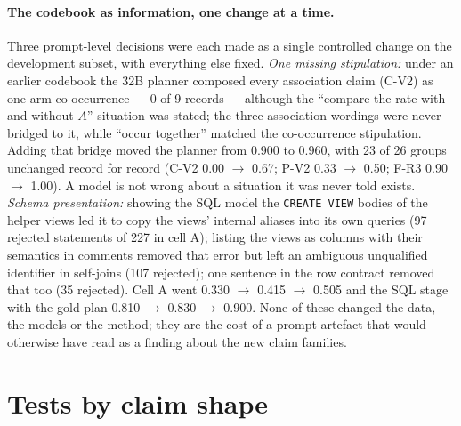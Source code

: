 \paragraph{The codebook as information, one change at a time.} Three
prompt-level decisions were each made as a single controlled change on the
development subset, with everything else fixed. \emph{One missing
stipulation:} under an earlier codebook the 32B planner composed every
association claim (C-V2) as one-arm co-occurrence --- 0 of 9 records ---
although the ``compare the rate with and without $A$'' situation was stated;
the three association wordings were never bridged to it, while ``occur
together'' matched the co-occurrence stipulation. Adding that bridge moved the
planner from 0.900 to 0.960, with 23 of 26 groups unchanged record for record
(C-V2 0.00 $\rightarrow$ 0.67; P-V2 0.33 $\rightarrow$ 0.50; F-R3 0.90
$\rightarrow$ 1.00). A model is not wrong about a situation it was never told exists.
\emph{Schema presentation:} showing the SQL model the \texttt{CREATE VIEW}
bodies of the helper views led it to copy the views' internal aliases into its
own queries (97 rejected statements of 227 in cell A); listing the views as
columns with their semantics in comments removed that error but left an
ambiguous unqualified identifier in self-joins (107 rejected); one sentence in
the row contract removed that too (35 rejected). Cell A went 0.330
$\rightarrow$ 0.415 $\rightarrow$ 0.505 and the SQL stage with the gold plan
0.810 $\rightarrow$ 0.830 $\rightarrow$ 0.900. None of these changed the data,
the models or the method; they are the cost of a prompt artefact that would
otherwise have read as a finding about the new claim families.



\fi  %

\iffalse  %
\section{Tests by claim shape}
\label{app:tests}

